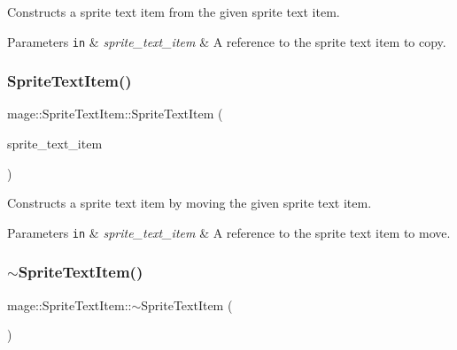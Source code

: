 Constructs a sprite text item from the given sprite text item.


\begin{DoxyParams}[1]{Parameters}
\mbox{\tt in}  & {\em sprite\+\_\+text\+\_\+item} & A reference to the sprite text item to copy. \\
\hline
\end{DoxyParams}
\hypertarget{structmage_1_1_sprite_text_item_a63f6da078daaf11e0412ab242eb233ee}{}\label{structmage_1_1_sprite_text_item_a63f6da078daaf11e0412ab242eb233ee} 
\subsubsection{\texorpdfstring{Sprite\+Text\+Item()}{SpriteTextItem()}\hspace{0.1cm}{\footnotesize\ttfamily [6/6]}}
{\footnotesize\ttfamily mage\+::\+Sprite\+Text\+Item\+::\+Sprite\+Text\+Item (\begin{DoxyParamCaption}\item[{\hyperlink{structmage_1_1_sprite_text_item}{Sprite\+Text\+Item} \&\&}]{sprite\+\_\+text\+\_\+item }\end{DoxyParamCaption})\hspace{0.3cm}{\ttfamily [default]}}

Constructs a sprite text item by moving the given sprite text item.


\begin{DoxyParams}[1]{Parameters}
\mbox{\tt in}  & {\em sprite\+\_\+text\+\_\+item} & A reference to the sprite text item to move. \\
\hline
\end{DoxyParams}
\hypertarget{structmage_1_1_sprite_text_item_a7e130ad6ffd67a6bae97cae676c6bbb0}{}\label{structmage_1_1_sprite_text_item_a7e130ad6ffd67a6bae97cae676c6bbb0} 
\subsubsection{\texorpdfstring{$\sim$\+Sprite\+Text\+Item()}{~SpriteTextItem()}}
{\footnotesize\ttfamily mage\+::\+Sprite\+Text\+Item\+::$\sim$\+Sprite\+Text\+Item (\begin{DoxyParamCaption}{ }\end{DoxyParamCaption})\hspace{0.3cm}{\ttfamily [default]}}

